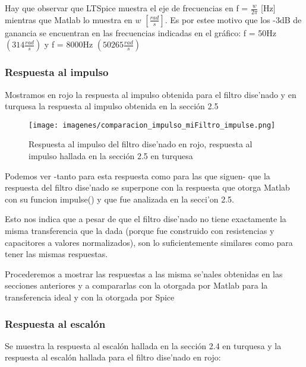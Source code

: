 \documentclass[12pt, titlepage]{article}
\begin{document}
    Hay que observar que LTSpice muestra el eje de frecuencias en f = $\frac{w}{2\pi}$ [Hz] mientras que Matlab lo muestra en $w$ $[\frac{rad}{s}]$. Es por estee motivo que los -3dB de ganancia se encuentran en las frecuencias indicadas en el gráfico: f = 50Hz $(314\frac{rad}{s})$ y f = 8000Hz $(50265\frac{rad}{s})$
    
    \newpage
    
    \subsubsection{Respuesta al impulso}
  
    Mostramos en rojo la respuesta al impulso obtenida para el filtro  dise'nado y en turquesa la respuesta al impulso obtenida en la sección 2.5
  
   \begin{figure}[!htb]
    \texttt{[image: imagenes/comparacion\_impulso\_miFiltro\_impulse.png]}
    \centering
    \caption{Respuesta al impulso del filtro dise'nado en rojo, respuesta al impulso hallada en la sección 2.5 en turquesa}
    \end{figure}
    \vspace{2mm}
    Podemos ver -tanto para esta respuesta como para las que siguen- que la respuesta del filtro dise'nado se superpone con la respuesta que otorga Matlab con su funcion impulse() y que fue analizada en la secci'on 2.5. 
    
    \vspace{6mm}
    
    Esto nos indica que a pesar de que el filtro dise'nado no tiene exactamente la misma transferencia que la dada (porque fue construido con resistencias y capacitores a valores normalizados), son lo suficientemente similares como para tener las mismas respuestas. 
    
    \vspace{6mm}
    
    Procederemos a mostrar las respuestas a las misma se'nales obtenidas en las secciones anteriores y a compararlas con la otorgada por Matlab para la transferencia ideal y con la otorgada por Spice
    
    \newpage
    
    
    \subsubsection{Respuesta al escalón}
    
    Se muestra la respuesta al escalón hallada en la sección 2.4 en turquesa y la respuesta al escalón hallada para el filtro dise'nado en rojo:
    
\end{document}
